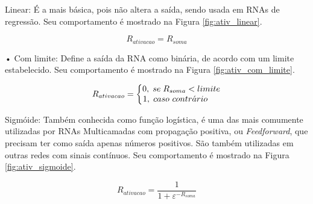 \documentclass[12pt,oneside,a4paper,chapter=TITLE,section=TITLE,sumario
		=tradicional]{abntex2}
\begin{document}
		\begin{lista}
			\item Linear: É a mais básica, pois não altera a saída, sendo usada em RNAs de regressão. Seu comportamento é mostrado na Figura \ref{fig:ativ_linear}.
			
			\begin{equation}
			R_{ativacao} = R_{soma}
			\end{equation}
					
			\begin{figure}[H]
			\end{figure}
			
			\item[•] Com limite: Define a saída da RNA como binária, de acordo com um limite estabelecido. Seu comportamento é mostrado na Figura \ref{fig:ativ_com_limite}.
			
			\begin{equation}
			R_{ativacao} = \left\{\begin{matrix}
			0,\hspace{0.1cm}se \hspace{0.1cm} R_{soma} < limite\\\hspace{-0.5cm}1,\hspace{0.1cm}caso\ contr\acute{a}rio  
			\end{matrix}\right.
			\end{equation}
			
			\begin{figure}[H]
			\end{figure}
			
			\item Sigmóide: Também conhecida como função logística, é uma das mais comumente utilizadas por RNAs Multicamadas com propagação positiva, ou \textit{Feedforward}, que precisam ter como saída apenas números positivos. São também utilizadas em outras redes com sinais contínuos. Seu comportamento é mostrado na Figura \ref{fig:ativ_sigmoide}.
			
			\begin{equation}
			R_{ativacao} = \frac{1}{1 + \varepsilon^{-R_{soma}}}
			\end{equation}
			\vspace{0.1cm}
			

\end{lista}
\end{document}
